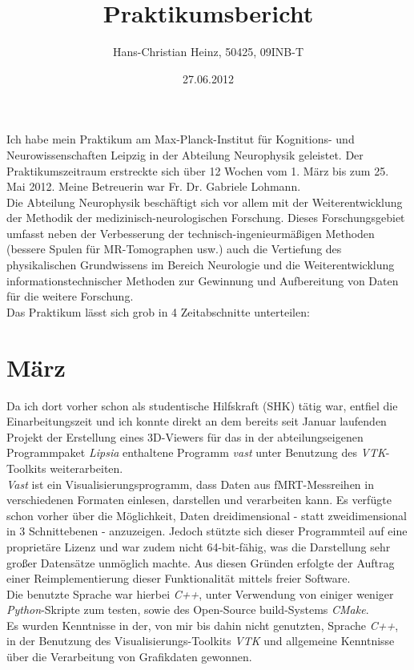 \documentclass[a4paper,10pt]{article}
\title{Praktikumsbericht }
\author{Hans-Christian Heinz, 50425, 09INB-T}
\date{27.06.2012}
\begin{document}
\maketitle

Ich habe mein Praktikum am Max-Planck-Institut für Kognitions- und Neurowissenschaften Leipzig in der Abteilung Neurophysik geleistet. Der Praktikumszeitraum erstreckte sich über 12 Wochen vom 1. März bis zum 25. Mai 2012. Meine Betreuerin war Fr. Dr. Gabriele Lohmann.\\
Die Abteilung Neurophysik beschäftigt sich vor allem mit der Weiterentwicklung der Methodik der medizinisch-neurologischen Forschung. Dieses Forschungsgebiet umfasst neben der Verbesserung der technisch-ingenieurmäßigen Methoden (bessere Spulen für MR-Tomographen usw.) auch die Vertiefung des physikalischen Grundwissens im Bereich Neurologie und die Weiterentwicklung informationstechnischer Methoden zur Gewinnung und Aufbereitung von Daten für die weitere Forschung.\\
Das Praktikum lässt sich grob in 4 Zeitabschnitte unterteilen:\\

\section{März}
Da ich dort vorher schon als studentische Hilfskraft (SHK) tätig war, entfiel die Einarbeitungszeit und ich konnte direkt an dem bereits seit Januar laufenden Projekt der Erstellung eines 3D-Viewers für das in der abteilungseigenen Programmpaket \emph{Lipsia} enthaltene Programm \emph{vast} unter Benutzung des \emph{VTK}-Toolkits weiterarbeiten.\\
\emph{Vast} ist ein Visualisierungsprogramm, dass Daten aus fMRT-Messreihen in verschiedenen Formaten einlesen, darstellen und verarbeiten kann. Es verfügte schon vorher über die Möglichkeit, Daten dreidimensional - statt zweidimensional in 3 Schnittebenen - anzuzeigen. Jedoch stützte sich dieser Programmteil auf eine proprietäre Lizenz und war zudem nicht 64-bit-fähig, was die Darstellung sehr großer Datensätze unmöglich machte. Aus diesen Gründen erfolgte der Auftrag einer Reimplementierung dieser Funktionalität mittels freier Software.\\
Die benutzte Sprache war hierbei \emph{C++}, unter Verwendung von einiger weniger \emph{Python}-Skripte zum testen, sowie des Open-Source build-Systems \emph{CMake}.\\
Es wurden Kenntnisse in der, von mir bis dahin nicht genutzten, Sprache \emph{C++}, in der Benutzung des Visualisierungs-Toolkits \emph{VTK} und allgemeine Kenntnisse über die Verarbeitung von Grafikdaten gewonnen.\\
\end{document}
